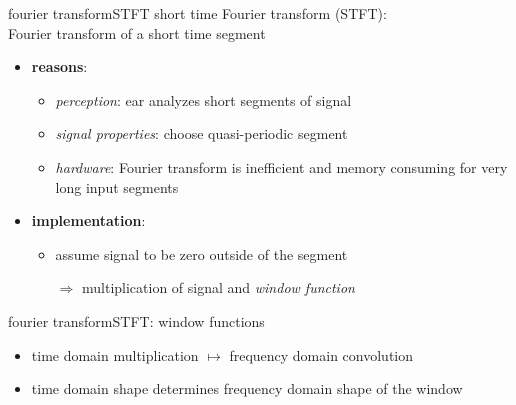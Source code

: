         \begin{frame}{fourier transform}{STFT}
            short time Fourier transform (STFT):\\ Fourier transform of a short time segment

            \bigskip	
                \begin{itemize}
                    \item<2->   \textbf{reasons}:
                        \begin{itemize}
                            \item	\textit{perception}: ear analyzes short segments of signal
                            \item	\textit{signal properties}: choose quasi-periodic segment
                            \item	\textit{hardware}: Fourier transform is inefficient and memory consuming for very long input segments
                        \end{itemize}
                    \smallskip
                    \item <3->  \textbf{implementation}:
                        \begin{itemize}
                            \item   assume signal to be zero outside of the segment
                            \item[$\Rightarrow$] multiplication of signal and \textit{window function}
                        \end{itemize}
                \end{itemize}
            


        \end{frame}	

        \begin{frame}{fourier transform}{STFT: window functions}
            \begin{itemize}
                \item   time domain multiplication $\mapsto$ frequency domain convolution 
                \item   time domain shape determines frequency domain shape of the window
            \end{itemize}
            \vspace{70mm}
        \end{frame}	

